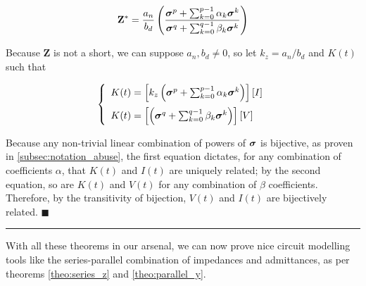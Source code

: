 \begin{equation} \mathbf{Z}^* = \dfrac{a_n}{b_d} \left(\dfrac{\boldsymbol{\sigma}^p + \sum_{k=0}^{p-1} \alpha_k \boldsymbol{\sigma}^k}{\boldsymbol{\sigma}^q + \sum_{k=0}^{q-1} \beta_k \boldsymbol{\sigma}^k}\right)\end{equation}

	Because $\mathbf{Z}$ is not a short, we can suppose $a_n,b_d\neq 0$, so let $k_z = a_n/b_d$ and $K(t)$ such that

\begin{equation} \left\{ \begin{array}{l} K(t) = \left[k_z \left(\boldsymbol{\sigma}^p + \sum_{k=0}^{p-1} \alpha_k\boldsymbol{\sigma}^k\right)\right]\left[I\right] \\[3mm] K(t) = \left[\left(\boldsymbol{\sigma}^q + \sum_{k=0}^{q-1} \beta_k \boldsymbol{\sigma}^k\right)\right]\left[V\right] \end{array}\right. \end{equation}

	Because any non-trivial linear combination of powers of $\boldsymbol{\sigma}$ is bijective, as proven in \ref{subsec:notation_abuse}, the first equation dictates, for any combination of coefficients $\alpha$, that $K(t)$ and $I(t)$ are uniquely related; by the second equation, so are $K(t)$ and $V(t)$ for any combination of $\beta$ coefficients. Therefore, by the transitivity of bijection, $V(t)$ and $I(t)$ are bijectively related. \hfill$\blacksquare$ \vspace{5mm}\hrule\vspace{5mm} %

	With all these theorems in our arsenal, we can now prove nice circuit modelling tools like the series-parallel combination of impedances and admittances, as per theorems \ref{theo:series_z} and \ref{theo:parallel_y}.

